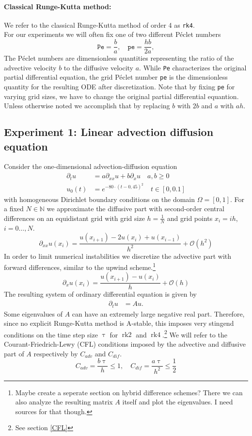 \documentclass{scrartcl}
\begin{document}
\paragraph{Classical Runge-Kutta method:}
We refer to the classical Runge-Kutta method of order 4 as \texttt{rk4}.\\


\noindent For our experiments we will often fix one of two different P\'eclet numbers
\[\texttt{Pe} = \frac{b}{a}, \quad \texttt{pe} = \frac{hb}{2a},\]
The P\'eclet numbers are dimensionless quantities representing the ratio of the advective velocity $b$ to the diffusive velocity $a$. While \texttt{Pe} characterizes the original partial differential equation, the grid P\'eclet number \texttt{pe} is the dimensionless quantity for the resulting ODE after discretization. Note that by fixing \texttt{pe} for varying grid sizes, we have to change the original partial differential equantion. Unless otherwise noted we accomplish that by replacing $b$ with $2b$ and $a$ with $ah$.


\subsection{Experiment 1: Linear advection diffusion equation}
Consider the one-dimensional advection-diffusion equation
\begin{align*}
\partial_tu &= a\partial_{xx}u + b\partial_xu \quad a,b\ge 0\\
u_0(t) &= e^{-80\cdot(t-0,45)^2} \quad t\in[0,0.1]
\end{align*}
with homogeneous Dirichlet boundary conditions on the domain $\Omega = [0,1]$. 
For a fixed $N\in\mathbb N$ we approximate the diffusive part with second-order central differences on an equidistant grid with grid size $h = \frac{1}{N}$ and grid points $x_i = ih$, $i=0\dots,N$.
\[\partial_{xx}u(x_i) = \frac{u(x_{i+1}) - 2u(x_i) + u(x_{i-1})}{{h}^2} + \mathcal{O}({h}^2)\]
In order to limit numerical instabilities we discretize the advective part with forward differences, similar to the upwind scheme.\footnote{Maybe create a seperate section on hybrid difference schemes? There we can also analyze the resulting matrix $A$ itself and plot the eigenvalues. I need sources for that though.}
\[\partial_{x}u(x_i) = \frac{u(x_{i+1}) - u(x_i)}{h} + \mathcal{O}(h)\]
The resulting system of ordinary differential equation is given by
\begin{align*}
\partial_tu &= Au.
\end{align*} 
Some eigenvalues of $A$ can have an extremely large negative real part. Therefore, since no explicit Runge-Kutta method is A-stable, this imposes very stingend conditions on the time step size $\uptau$ for $\operatorname{rk2}$ and $\operatorname{rk4}$.\footnote{See section \ref{CFL}} We will refer to the Courant-Friedrich-Lewy (CFL) conditions imposed by the advective and diffusive part of $A$ respectively by $C_{adv}$ and $C_{dif}$.  
\[ C_{adv} = \frac{b\uptau}{h} \le 1, \quad C_{dif} = \frac{a\uptau}{h^2} \le \frac{1}{2}\] 
\end{document}
